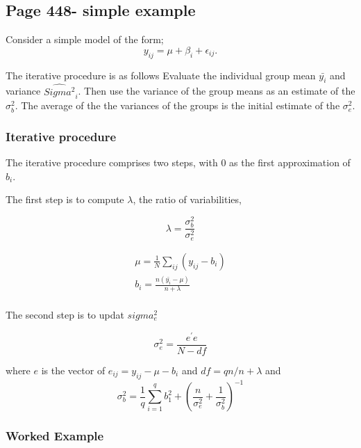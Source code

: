 \documentclass[12pt, a4paper]{report}
\theoremstyle{plain}
\theoremstyle{definition}
\theoremstyle{remark}
\begin{document}
	\subsection{Page 448- simple example}
	Consider a simple model of the form;
	\begin{equation*}
	y_{ij} = \mu + \beta_{i} + \epsilon_{ij}.
	\end{equation*}
	
	The iterative procedure is as follows Evaluate the individual group mean $\bar{y_{i}}$ and variance $\hat{Sigma^2}_{i}$. Then use the variance of the group means as an estimate of the $\sigma^2_{b}$. The average of the the variances of the groups is the initial estimate of the $\sigma^2_{e}$.
	\subsubsection{Iterative procedure}
	
	The iterative procedure comprises two steps, with $0$ as the first approximation of $b_{i}$.
	
	The first step is to compute $\lambda$, the ratio of variabilities,
	
	\begin{equation*}
	\lambda = \frac{\sigma^2_{b}}{\sigma^2_{e}}
	\end{equation*}
	
	\begin{eqnarray*}
		\mu = \frac{1}{N} \sum_{ij} (y_{ij} - b_{i}) \\
		b_{i} = \frac{n(\bar{y_{i}}-\mu)}{n+ \lambda} \\
	\end{eqnarray*}
	
	
	The second step is to updat $sigma^2_{e}$
	
	\begin{equation}
	\sigma^2_{e} = \frac{e^{\prime}e}{N-df}
	\end{equation}
	
	where $e$ is the vector of $e_{ij} = y_{ij}-\mu-b_{i}$ and $df =
	qn / n+\lambda$ and
	\begin{equation}
	\sigma^{2}_{b} = \frac{1}{q} \sum_{i=1}^{q} b_{1}^2 +
	(\frac{n}{\sigma^2_{e}}+\frac{1}{\sigma^2_{b}})^{-1}
	\end{equation}
	
	\subsubsection{Worked Example}
	
\end{document}
